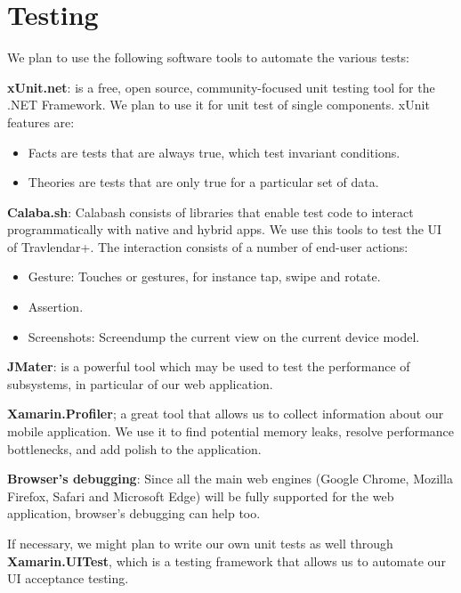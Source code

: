 \section*{Testing}
We plan to use the following software tools to automate the various tests:
\begin{description}
\item \textbf{xUnit.net}: is a free, open source, community-focused unit testing tool for the .NET Framework. 
We plan to use it for unit test of single components. xUnit features are:
\begin{itemize}
\item Facts are tests that are always true, which test invariant conditions.
\item Theories are tests that are only true for a particular set of data.
\end{itemize}
\item \textbf{Calaba.sh}: Calabash consists of libraries that enable test code to interact programmatically with native and hybrid apps. We use this tools to test the UI of Travlendar+. The interaction consists of a number of end-user actions:
\begin{itemize}
\item Gesture: Touches or gestures, for instance tap, swipe and rotate.
\item Assertion.
\item Screenshots: Screendump the current view on the current device model.
\end{itemize}
\item \textbf{JMater}: is a powerful tool which may be used to test the performance of subsystems, in particular of our web application.
\item \textbf{Xamarin.Profiler}; a great tool that allows us to collect information about our mobile application. We use it to find potential memory leaks, resolve performance bottlenecks, and add polish to the application.
\item \textbf{Browser's debugging}: Since all the main web engines (Google Chrome, Mozilla Firefox, Safari and Microsoft Edge) will be fully supported for the web application, browser's debugging can help too.
\end{description}
If necessary, we might plan to write our own unit tests as well through \textbf{Xamarin.UITest}, which is a testing framework that allows us to automate our UI acceptance testing. 


 



